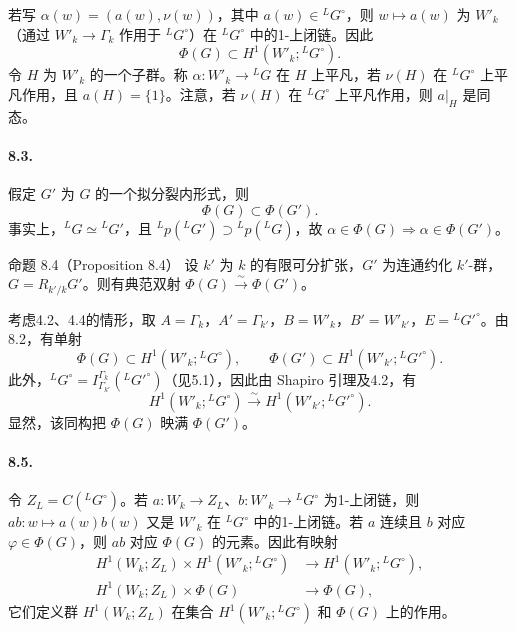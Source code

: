 若写 $\alpha(w)=(a(w),\nu(w))$，其中 $a(w)\in{}^LG^\circ$，则 $w\mapsto a(w)$ 为 $W'_k$（通过 $W'_k\to\Gamma_k$ 作用于 ${}^LG^\circ$）在 ${}^LG^\circ$ 中的1-上闭链。因此
\begin{equation}
 \Phi(G)\subset H^1(W'_k;{}^LG^\circ).\tag{1}
\end{equation}
令 $H$ 为 $W'_k$ 的一个子群。称 $\alpha:W'_k\to{}^LG$ 在 $H$ 上平凡，若 $\nu(H)$ 在 ${}^LG^\circ$ 上平凡作用，且 $a(H)=\{1\}$。注意，若 $\nu(H)$ 在 ${}^LG^\circ$ 上平凡作用，则 $a|_H$ 是同态。

\paragraph*{8.3.} 假定 $G'$ 为 $G$ 的一个拟分裂内形式，则
\begin{equation}
 \Phi(G)\subset\Phi(G').\tag{1}
\end{equation}
事实上，${}^LG\simeq{}^LG'$，且 ${}^Lp({}^LG')\supset{}^Lp({}^LG)$，故 $\alpha\in\Phi(G)\Rightarrow\alpha\in\Phi(G')$。

\begin{originaltheorem}{命题 8.4（Proposition 8.4）}
设 $k'$ 为 $k$ 的有限可分扩张，$G'$ 为连通约化 $k'$-群，$G=R_{k'/k}G'$。则有典范双射 $\Phi(G)\xrightarrow{\sim}\Phi(G')$。
\end{originaltheorem}
考虑4.2、4.4的情形，取 $A=\Gamma_k$，$A'=\Gamma_{k'}$，$B=W'_k$，$B'=W'_{k'}$，$E={}^LG'^\circ$。由8.2，有单射
\[
 \Phi(G)\subset H^1(W'_k;{}^LG^\circ),\qquad
 \Phi(G')\subset H^1(W'_{k'};{}^LG'^\circ).
\]
此外，${}^LG^\circ=I_{\Gamma_{k'}}^{\Gamma_k}({}^LG'^\circ)$（见5.1），因此由 Shapiro 引理及4.2，有
\[
 H^1(W'_k;{}^LG^\circ)\xrightarrow{\sim}H^1(W'_{k'};{}^LG'^\circ).
\]
显然，该同构把 $\Phi(G)$ 映满 $\Phi(G')$。

\paragraph*{8.5.} 令 $Z_L=C({}^LG^\circ)$。若 $a:W_k\to Z_L$、$b:W'_k\to{}^LG^\circ$ 为1-上闭链，则 $ab:w\mapsto a(w)b(w)$ 又是 $W'_k$ 在 ${}^LG^\circ$ 中的1-上闭链。若 $a$ 连续且 $b$ 对应 $\varphi\in\Phi(G)$，则 $ab$ 对应 $\Phi(G)$ 的元素。因此有映射
\begin{align}
 H^1(W_k;Z_L)\times H^1(W'_k;{}^LG^\circ)&\longrightarrow H^1(W'_k;{}^LG^\circ),\tag{1}\\
 H^1(W_k;Z_L)\times\Phi(G)&\longrightarrow\Phi(G),\tag{2}
\end{align}
它们定义群 $H^1(W_k;Z_L)$ 在集合 $H^1(W'_k;{}^LG^\circ)$ 和 $\Phi(G)$ 上的作用。

